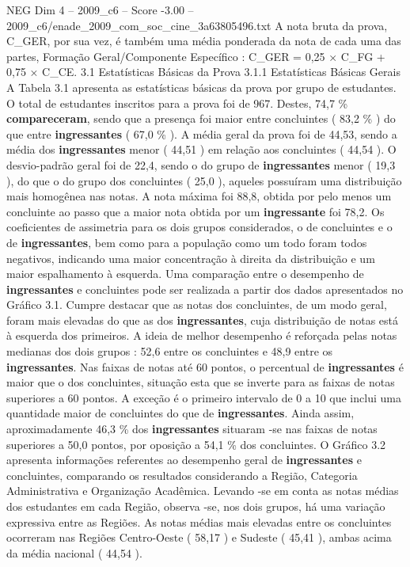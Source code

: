 \begin{textsample}{NEG Dim 4 – 2009\_c6 – Score -3.00 – 2009\_c6/enade\_2009\_com\_soc\_cine\_3a63805496.txt}
A nota bruta da prova, C\_GER, por sua vez, é também uma média ponderada da nota de cada uma das partes, Formação Geral/Componente Específico : C\_GER = 0,25 × C\_FG + 0,75 × C\_CE. 3.1 Estatísticas Básicas da Prova 3.1.1 Estatísticas Básicas Gerais A Tabela 3.1 apresenta as estatísticas básicas da prova por grupo de estudantes.
O total de estudantes inscritos para a prova foi de 967.
Destes, 74,7 \% \textbf{compareceram}, sendo que a presença foi maior entre concluintes ( 83,2 \% ) do que entre \textbf{ingressantes} ( 67,0 \% ).
A média geral da prova foi de 44,53, sendo a média dos \textbf{ingressantes} menor ( 44,51 ) em relação aos concluintes ( 44,54 ).
O desvio-padrão geral foi de 22,4, sendo o do grupo de \textbf{ingressantes} menor ( 19,3 ), do que o do grupo dos concluintes ( 25,0 ), aqueles possuíram uma distribuição mais homogênea nas notas.
A nota máxima foi 88,8, obtida por pelo menos um concluinte ao passo que a maior nota obtida por um \textbf{ingressante} foi 78,2.
Os coeficientes de assimetria para os dois grupos considerados, o de concluintes e o de \textbf{ingressantes}, bem como para a população como um todo foram todos negativos, indicando uma maior concentração à direita da distribuição e um maior espalhamento à esquerda.
Uma comparação entre o desempenho de \textbf{ingressantes} e concluintes pode ser realizada a partir dos dados apresentados no Gráfico 3.1.
Cumpre destacar que as notas dos concluintes, de um modo geral, foram mais elevadas do que as dos \textbf{ingressantes}, cuja distribuição de notas está à esquerda dos primeiros.
A ideia de melhor desempenho é reforçada pelas notas medianas dos dois grupos : 52,6 entre os concluintes e 48,9 entre os \textbf{ingressantes}.
Nas faixas de notas até 60 pontos, o percentual de \textbf{ingressantes} é maior que o dos concluintes, situação esta que se inverte para as faixas de notas superiores a 60 pontos.
A exceção é o primeiro intervalo de 0 a 10 que inclui uma quantidade maior de concluintes do que de \textbf{ingressantes}.
Ainda assim, aproximadamente 46,3 \% dos \textbf{ingressantes} situaram -se nas faixas de notas superiores a 50,0 pontos, por oposição a 54,1 \% dos concluintes.
O Gráfico 3.2 apresenta informações referentes ao desempenho geral de \textbf{ingressantes} e concluintes, comparando os resultados considerando a Região, Categoria Administrativa e Organização Acadêmica.
Levando -se em conta as notas médias dos estudantes em cada Região, observa -se, nos dois grupos, há uma variação expressiva entre as Regiões.
As notas médias mais elevadas entre os concluintes ocorreram nas Regiões Centro-Oeste ( 58,17 ) e Sudeste ( 45,41 ), ambas acima da média nacional ( 44,54 ).

\end{textsample}

